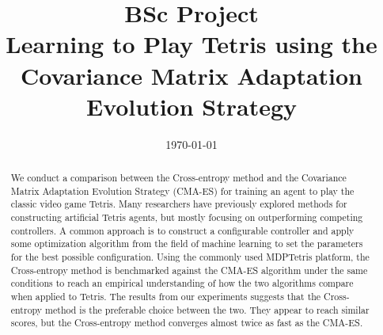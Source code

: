 







%
    

\title{BSc Project\\\textbf{Learning to Play Tetris using
    the Covariance Matrix Adaptation
    Evolution Strategy}}
\date{\today}

\thispagestyle{empty}
\tableofcontents
\thispagestyle{empty}

\clearpage

\thispagestyle{empty}
\begin{abstract}
We conduct a comparison between 
the Cross-entropy method and the Covariance Matrix Adaptation
Evolution Strategy (CMA-ES) for training 
an agent to play the classic video game Tetris. Many researchers have 
previously explored methods for constructing artificial Tetris
agents, but mostly focusing on outperforming competing controllers.
A common approach is to construct a configurable controller
and apply some optimization algorithm from the field of machine learning
to set the parameters for the best possible configuration. Using the 
commonly used MDPTetris \citep{mdptetris} platform, the Cross-entropy
method is benchmarked against the CMA-ES algorithm under the same
conditions to reach an empirical understanding of how the two algorithms
compare when applied to Tetris. The results from our experiments
suggests that the Cross-entropy method is the preferable choice
between the two. They appear to reach similar scores, 
but the Cross-entropy method converges almost twice as
fast as the CMA-ES.
\end{abstract}

